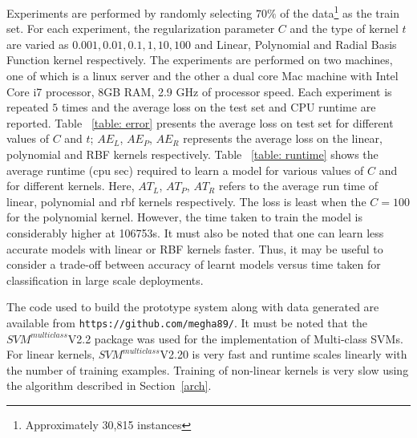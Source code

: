 \documentclass[letterpaper]{article}
\begin{document}
Experiments are performed by randomly selecting $70\%$ of the data\footnote{Approximately 30,815 instances}  as the train set. For each experiment, the regularization parameter $C$ and the type of kernel $t$ are varied as $0.001,0.01,0.1,1,10,100$ and Linear, Polynomial and Radial Basis Function kernel respectively. The experiments are performed on two machines, one of which is a linux server and the other a dual core Mac machine with Intel Core i7 processor, 8GB RAM, 2.9 GHz of processor speed. Each experiment is repeated $5$ times and the average loss on the test set and CPU runtime are reported. Table ~\ref{table: error} presents the average loss on test set for different values of $C$ and $t$; $AE_{L}$, $AE_{P}$, $AE_{R}$ represents the average loss on the linear, polynomial and RBF kernels respectively. Table ~\ref{table: runtime} shows the average runtime (cpu sec) required to learn a model for various values of $C$ and for different kernels. Here, $AT_{L}$, $AT_{P}$, $AT_{R}$ refers to the average run time of linear, polynomial and rbf kernels respectively. The loss is least when the $C = 100$ for the polynomial kernel. However, the time taken to train the model is considerably higher at 106753s. It must also be noted that one can learn less accurate models with linear or RBF kernels faster. Thus, it may be useful to consider a trade-off between accuracy of learnt models versus time taken for classification in large scale deployments.
 
The code used to build the prototype system along with data generated are available from \texttt{https://github.com/megha89/}. It must be noted that the $SVM^{multiclass}$V2.2 package \cite{algo} was used for the implementation of Multi-class SVMs. 
For linear kernels, $SVM^{multiclass}$V2.20 is very fast and runtime scales linearly with the number of training examples. Training of non-linear kernels is very slow using the algorithm described in Section~\ref{arch}.

\end{document}
